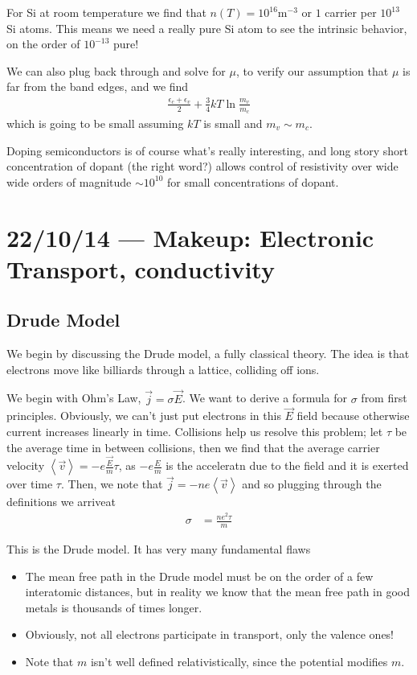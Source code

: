 \documentclass[10pt]{report}
\newcommand{\expvalue}[1]{\left<#1\right>}
\begin{document}
For Si at room temperature we find that $n(T) = 10^{16}\mathrm{m^{-3}}$ or $1$ carrier per $10^{13}$ Si atoms. This means we need a really pure Si atom to see the intrinsic behavior, on the order of $10^{-13}$ pure!

We can also plug back through and solve for $\mu$, to verify our assumption that $\mu$ is far from the band edges, and we find
\begin{align}
    \frac{\epsilon_c + \epsilon_v}{2} + \frac{3}{4}kT \ln \frac{m_v}{m_c}
\end{align}
which is going to be small assuming $kT$ is small and $m_v \sim m_c$. 

Doping semiconductors is of course what's really interesting, and long story short concentration of dopant (the right word?) allows control of resistivity over wide wide orders of magnitude $\sim 10^{10}$ for small concentrations of dopant. 

\chapter{22/10/14 --- Makeup: Electronic Transport, conductivity}

\section{Drude Model}

We begin by discussing the Drude model, a fully classical theory. The idea is that electrons move like billiards through a lattice, colliding off ions.

We begin with Ohm's Law, $\vec{j} = \sigma \vec{E}$. We want to derive a formula for $\sigma$ from first principles. Obviously, we can't just put electrons in this $\vec{E}$ field because otherwise current increases linearly in time. Collisions help us resolve this problem; let $\tau$ be the average time in between collisions, then we find that the average carrier velocity $\expvalue{\vec{v}} = -e\frac{\vec{E}}{m}\tau$, as $-e\frac{E}{m}$ is the acceleratn due to the field and it is exerted over time $\tau$. Then, we note that $\vec{j} = -ne\expvalue{\vec{v}}$ and so plugging through the definitions we arriveat
\begin{align}
    \sigma &= \frac{ne^2\tau}{m}
\end{align}

This is the Drude model.  It has very many fundamental flaws
\begin{itemize}
    \item The mean free path in the Drude model must be on the order of a few interatomic distances, but in reality we know that the mean free path in good metals is thousands of times longer.
    \item Obviously, not all electrons participate in transport, only the valence ones! 
    \item Note that $m$ isn't well defined relativistically, since the potential modifies $m$.
\end{itemize}
\end{document}
